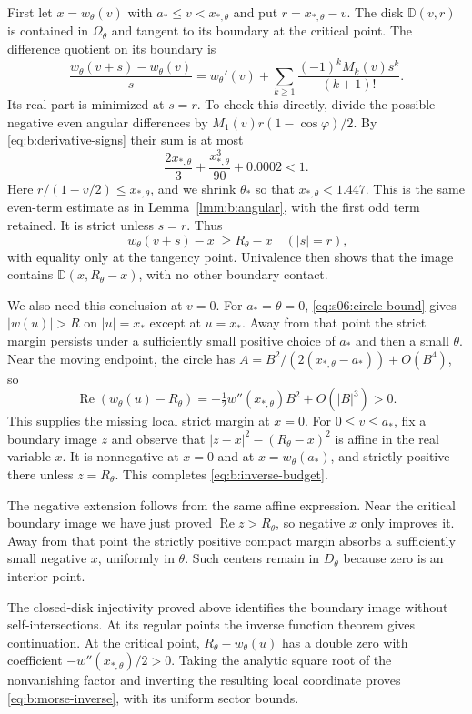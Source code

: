 \begin{prf}
First let $x=w_\theta(v)$ with $a_*\leq v<x_{*,\theta}$ and put
$r=x_{*,\theta}-v$. The disk $\mathbb D(v,r)$ is contained in
$\Omega_\theta$ and tangent to its boundary at the critical point.
The difference quotient on its boundary is
\[
 \frac{w_\theta(v+s)-w_\theta(v)}s
 =w_\theta'(v)+\sum_{k\geq1}
                       \frac{(-1)^kM_k(v)s^k}{(k+1)!}.
\]
Its real part is minimized at $s=r$. To check this directly, divide
the possible negative even angular differences by
$M_1(v)r(1-\cos\varphi)/2$.
By \eqref{eq:b:derivative-signs} their sum is at most
\[
 \frac{2x_{*,\theta}}3+\frac{x_{*,\theta}^3}{90}+0.0002<1.
\]
Here $r/(1-v/2)\leq x_{*,\theta}$, and we shrink $\theta_*$ so
that $x_{*,\theta}<1.447$. This is the same even-term estimate as
in Lemma~\ref{lmm:b:angular}, with the first odd term retained.
It is strict unless $s=r$. Thus
\[
 |w_\theta(v+s)-x|\geq R_\theta-x\quad(|s|=r),
\]
with equality only at the tangency point. Univalence then shows that
the image contains $\mathbb D(x,R_\theta-x)$, with no other
boundary contact.

We also need this conclusion at $v=0$. For $a_*=\theta=0$,
\eqref{eq:s06:circle-bound} gives
$|w(u)|>R$ on $|u|=x_*$ except at $u=x_*$. Away from that point
the strict margin persists under a sufficiently small positive
choice of $a_*$ and then a small $\theta$. Near the moving endpoint,
the circle has $A=B^2/(2(x_{*,\theta}-a_*))+O(B^4)$, so
\[
 \operatorname{Re}(w_\theta(u)-R_\theta)
             =-\tfrac12w''(x_{*,\theta})B^2+O(|B|^3)>0.
\]
This supplies the missing local strict margin at $x=0$.
For $0\leq v\leq a_*$, fix a boundary image $z$ and observe that
$|z-x|^2-(R_\theta-x)^2$ is affine in the real variable $x$.
It is nonnegative at $x=0$ and at $x=w_\theta(a_*)$, and strictly
positive there unless $z=R_\theta$. This completes
\eqref{eq:b:inverse-budget}.

The negative extension follows from the same affine expression.
Near the critical boundary image we have just proved
$\operatorname{Re}z>R_\theta$, so negative $x$ only improves it.
Away from that point the strictly positive compact margin absorbs a
sufficiently small negative $x$, uniformly in $\theta$. Such centers
remain in $D_\theta$ because zero is an interior point.

The closed-disk injectivity proved above identifies the boundary
image without self-intersections. At its regular points the inverse
function theorem gives continuation. At the critical point,
$R_\theta-w_\theta(u)$ has a double zero with coefficient
$-w''(x_{*,\theta})/2>0$. Taking the analytic square root of the
nonvanishing factor and inverting the resulting local coordinate
proves \eqref{eq:b:morse-inverse}, with its uniform sector bounds.
\end{prf}

